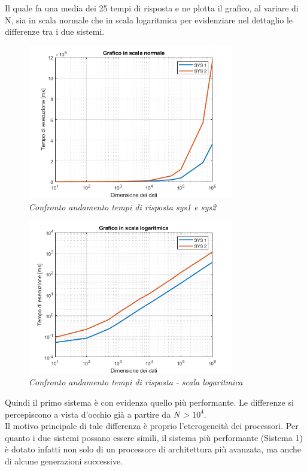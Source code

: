 Il quale fa una media dei 25 tempi di risposta e ne plotta il grafico, al variare di N, sia in scala normale che in scala logaritmica per evidenziare nel dettaglio le differenze tra i due sistemi.
\begin{figure}[H]
	\centering
	\includegraphics[width=0.8\textwidth]{img/hw0/grafico_naturale.png}
	\caption{\textit{Confronto andamento tempi di risposta sys1 e sys2}}
\end{figure}
\begin{figure}[H]
	\centering
	\includegraphics[width=0.8\textwidth]{img/hw0/grafico_log.png}
	\caption{\textit{Confronto andamento tempi di risposta - scala logaritmica}}
\end{figure}
Quindi il primo sistema è con evidenza quello più performante. Le differenze si percepiscono a vista d'occhio già a partire da \textit{N > $10^4$}.
\\Il motivo principale di tale differenza è proprio l'eterogeneità dei processori. Per quanto i due sistemi possano essere simili, il sistema più performante (Sistema 1) è dotato infatti non solo di un processore di architettura più avanzata, ma anche di alcune generazioni successive.
